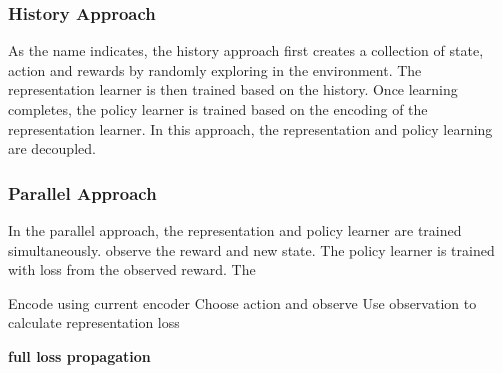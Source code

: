 \subsubsection{History Approach}
As the name indicates, the history approach first creates a collection of state, action and rewards by randomly exploring in the environment.
The representation learner is then trained based on the history.
Once learning completes, the policy learner is trained based on the encoding of the representation learner.
In this approach, the representation and policy learning are decoupled. 

\subsubsection{Parallel Approach}
In the parallel approach, the representation and policy learner are trained simultaneously.
observe the reward and new state. 
The policy learner is trained with loss from the observed reward.
The 



Encode using current encoder
Choose action and observe
Use observation to calculate representation loss

\textbf{full loss propagation}